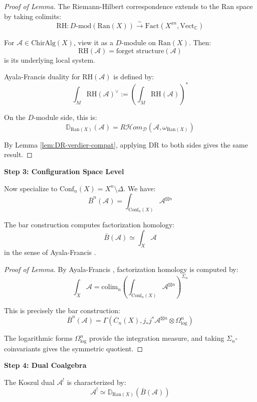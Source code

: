 \begin{proof}[Proof of Lemma]
The Riemann-Hilbert correspondence extends to the Ran space by taking colimits:
$$\text{RH}: D\text{-mod}(\text{Ran}(X)) \xrightarrow{\sim} 
\text{Fact}(X^{an}, \text{Vect}_\mathbb{C})$$

For $\mathcal{A} \in \text{ChirAlg}(X)$, view it as a $D$-module on $\text{Ran}(X)$. Then:
$$\text{RH}(\mathcal{A}) = \text{forget structure}(\mathcal{A})$$
is its underlying local system.

Ayala-Francis duality for $\text{RH}(\mathcal{A})$ is defined by:
$$\int_M \text{RH}(\mathcal{A})^{\vee} := \left(\int_M \text{RH}(\mathcal{A})\right)^*$$

On the $D$-module side, this is:
$$\mathbb{D}_{\text{Ran}(X)}(\mathcal{A}) = R\mathcal{H}om_{\mathcal{D}}(\mathcal{A}, 
\omega_{\text{Ran}(X)})$$

By Lemma \ref{lem:DR-verdier-compat}, applying $\text{DR}$ to both sides gives the same result.
\end{proof}

\textbf{Step 3: Configuration Space Level}

Now specialize to $\text{Conf}_n(X) = X^n \setminus \Delta$. We have:
$$\bar{B}^n(\mathcal{A}) = \int_{\text{Conf}_n(X)} \mathcal{A}^{\boxtimes n}$$

\begin{lemma}\label{lem:bar-as-fact-hom-AF}
The bar construction computes factorization homology:
$$\bar{B}(\mathcal{A}) \simeq \int_{X} \mathcal{A}$$
in the sense of Ayala-Francis \cite{AF15}.
\end{lemma}

\begin{proof}[Proof of Lemma]
By Ayala-Francis \cite[Theorem 4.19]{AF15}, factorization homology is computed by:
$$\int_X \mathcal{A} = \text{colim}_n \left(\int_{\text{Conf}_n(X)} 
\mathcal{A}^{\boxtimes n}\right)^{\Sigma_n}$$

This is precisely the bar construction:
$$\bar{B}^n(\mathcal{A}) = \Gamma(\overline{C}_n(X), j_* j^* \mathcal{A}^{\boxtimes n} 
\otimes \Omega^n_{\log})$$

The logarithmic forms $\Omega^n_{\log}$ provide the integration measure, and taking 
$\Sigma_n$-coinvariants gives the symmetric quotient.
\end{proof}

\textbf{Step 4: Dual Coalgebra}

The Koszul dual $\mathcal{A}^!$ is characterized by:
$$\mathcal{A}^! \simeq \mathbb{D}_{\text{Ran}(X)}(\bar{B}(\mathcal{A}))$$

